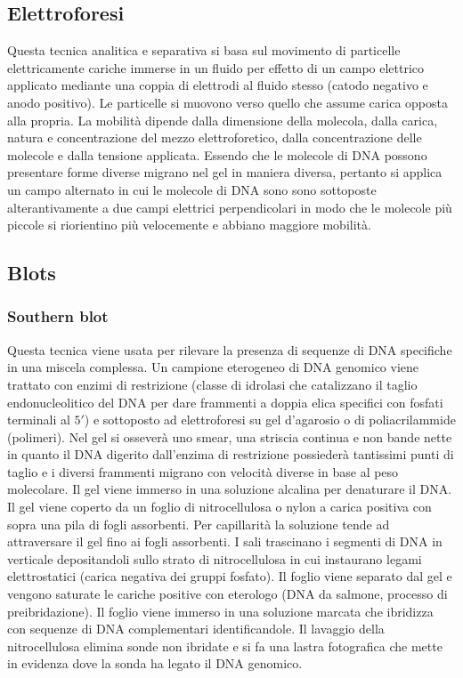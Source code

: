 \subsection{Elettroforesi}
Questa tecnica analitica e separativa si basa sul movimento di particelle elettricamente cariche immerse in un fluido per effetto di un campo elettrico applicato mediante una
coppia di elettrodi al fluido stesso (catodo negativo e anodo positivo). Le particelle si muovono verso quello che assume carica opposta alla propria. La mobilit\`a dipende dalla 
dimensione della molecola, dalla carica, natura e concentrazione del mezzo elettroforetico, dalla concentrazione delle molecole  e dalla tensione applicata. Essendo che le molecole di
DNA possono presentare forme diverse migrano nel gel in maniera diversa, pertanto si applica un campo alternato in cui le molecole di DNA sono sono sottoposte alterantivamente a due 
campi elettrici perpendicolari in modo che le molecole pi\`u piccole si riorientino pi\`u velocemente e abbiano maggiore mobilit\`a. 
\subsection{Blots}
\subsubsection{Southern blot}
Questa tecnica viene usata per rilevare la presenza di sequenze di DNA specifiche in una miscela complessa. Un campione eterogeneo di DNA genomico viene trattato con enzimi di 
restrizione (classe di idrolasi che catalizzano il taglio endonucleolitico del DNA per dare frammenti a doppia elica specifici con fosfati terminali al $5'$) e sottoposto ad 
elettroforesi su gel d'agarosio o di poliacrilammide (polimeri). Nel gel si ossever\`a uno smear, una striscia continua e non bande nette in quanto il DNA digerito dall'enzima di 
restrizione possieder\`a tantissimi punti di taglio e i diversi frammenti migrano con velocit\`a diverse in base al peso molecolare. Il gel viene immerso in una soluzione alcalina per
denaturare il DNA. Il gel viene coperto da un foglio di nitrocellulosa o nylon a carica positiva con sopra una pila di fogli assorbenti. Per capillarit\`a la soluzione tende ad 
attraversare il gel fino ai fogli assorbenti. I sali trascinano i segmenti di DNA in verticale depositandoli sullo strato di nitrocellulosa in cui instaurano legami elettrostatici 
(carica negativa dei gruppi fosfato). Il foglio viene separato dal gel e vengono saturate le cariche positive con eterologo (DNA da salmone, processo di preibridazione). Il foglio viene
immerso in una soluzione marcata  che ibridizza con sequenze di DNA complementari identificandole. Il lavaggio della nitrocellulosa elimina sonde non ibridate e si fa una lastra 
fotografica che mette in evidenza dove la sonda ha legato il DNA genomico. 

